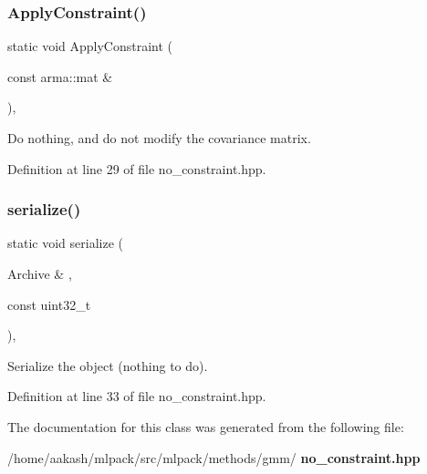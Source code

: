 \subsubsection{Apply\+Constraint()}
{\footnotesize\ttfamily static void Apply\+Constraint (\begin{DoxyParamCaption}\item[{const arma\+::mat \&}]{ }\end{DoxyParamCaption})\hspace{0.3cm}{\ttfamily [inline]}, {\ttfamily [static]}}



Do nothing, and do not modify the covariance matrix. 



Definition at line 29 of file no\+\_\+constraint.\+hpp.

\mbox{\label{classmlpack_1_1gmm_1_1NoConstraint_a408eb4ebf27591742383f36e84641a80}} 
\subsubsection{serialize()}
{\footnotesize\ttfamily static void serialize (\begin{DoxyParamCaption}\item[{Archive \&}]{,  }\item[{const uint32\+\_\+t}]{ }\end{DoxyParamCaption})\hspace{0.3cm}{\ttfamily [inline]}, {\ttfamily [static]}}



Serialize the object (nothing to do). 



Definition at line 33 of file no\+\_\+constraint.\+hpp.



The documentation for this class was generated from the following file\+:\begin{DoxyCompactItemize}
\item 
/home/aakash/mlpack/src/mlpack/methods/gmm/\textbf{ no\+\_\+constraint.\+hpp}\end{DoxyCompactItemize}
